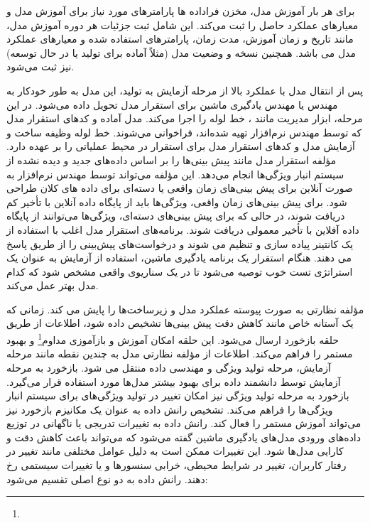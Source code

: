 برای هر بار آموزش مدل، مخزن فراداده ها پارامترهای مورد نیاز برای آموزش مدل و معیارهای عملکرد حاصل را ثبت می‌کند. این شامل ثبت جزئیات هر دوره آموزش مدل، مانند تاریخ و زمان آموزش، مدت زمان، پارامترهای استفاده شده و معیارهای عملکرد مدل می باشد. همچنین نسخه و وضعیت مدل (مثلاً آماده برای تولید یا در حال توسعه) نیز ثبت می‌شود.

پس از انتقال مدل با عملکرد بالا از مرحله آزمایش به تولید، این مدل به طور خودکار به مهندس  یا مهندس یادگیری ماشین برای استقرار مدل تحویل داده می‌شود. در این مرحله، ابزار مدیریت  مانند ، خط لوله  را اجرا می‌کند. مدل آماده و کدهای استقرار مدل که توسط مهندس نرم‌افزار تهیه شده‌اند، فراخوانی می‌شوند. خط لوله  وظیفه ساخت و آزمایش مدل و کدهای استقرار مدل برای استقرار در محیط عملیاتی را بر عهده دارد. مؤلفه استقرار مدل مانند  پیش بینی‌ها را بر اساس داده‌های جدید و دیده نشده از سیستم انبار ویژگی‌ها انجام می‌دهد. این مؤلفه می‌تواند توسط مهندس نرم‌افزار به صورت آنلاین برای پیش ‌بینی‌های زمان واقعی یا دسته‌ای برای داده های کلان طراحی شود. برای پیش بینی‌های زمان واقعی، ویژگی‌ها باید از پایگاه داده آنلاین با تأخیر کم دریافت شوند، در حالی که برای پیش بینی‌های دسته‌ای، ویژگی‌ها می‌توانند از پایگاه داده آفلاین با تأخیر معمولی دریافت شوند. برنامه‌های استقرار مدل اغلب با استفاده از یک کانتینر پیاده سازی و تنظیم می شوند و درخواست‌های پیش‌بینی را از طریق  پاسخ می دهند. هنگام استقرار یک برنامه یادگیری ماشین، استفاده از آزمایش  به عنوان یک استراتژی تست خوب توصیه می‌شود تا در یک سناریوی واقعی مشخص شود که کدام مدل بهتر عمل می‌کند.

مؤلفه نظارتی به صورت پیوسته عملکرد مدل و زیرساخت‌ها را پایش می کند. زمانی که یک آستانه خاص مانند کاهش دقت پیش بینی‌ها تشخیص داده شود، اطلاعات از طریق حلقه بازخورد ارسال می‌شود. این حلقه امکان آموزش و بازآموزی مداوم\footnote{} و بهبود مستمر را فراهم می‌کند. اطلاعات از مؤلفه نظارتی مدل به چندین نقطه مانند مرحله آزمایش، مرحله تولید ویژگی و مهندسی داده منتقل می شود. بازخورد به مرحله آزمایش توسط دانشمند داده برای بهبود بیشتر مدل‌ها مورد استفاده قرار می‌گیرد. بازخورد به مرحله تولید ویژگی نیز امکان تغییر در تولید ویژگی‌های برای سیستم انبار ویژگی‌ها را فراهم می‌کند. تشخیص رانش داده به عنوان یک مکانیزم بازخورد نیز می‌تواند آموزش مستمر را فعال کند. رانش داده به تغییرات تدریجی یا ناگهانی در توزیع داده‌های ورودی مدل‌های یادگیری ماشین گفته می‌شود که می‌تواند باعث کاهش دقت و کارایی مدل‌ها شود. این تغییرات ممکن است به دلیل عوامل مختلفی مانند تغییر در رفتار کاربران، تغییر در شرایط محیطی، خرابی سنسورها و یا تغییرات سیستمی رخ دهند. رانش داده به دو نوع اصلی تقسیم می‌شود:

